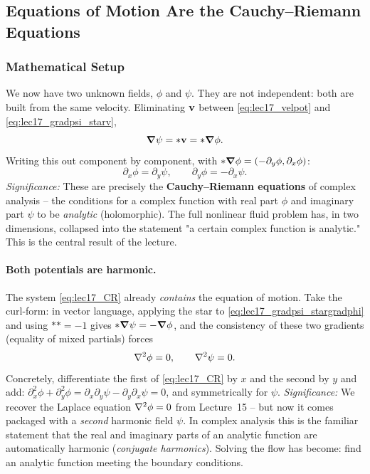 \documentclass[../main.tex]{subfiles}
\begin{document}
\subsection{Equations of Motion Are the Cauchy--Riemann Equations}\label{sec:lec17:cr}

\subsubsection*{Mathematical Setup}
We now have two unknown fields, $\phi$ and $\psi$. They are not independent: both are built from the same velocity. Eliminating $\mathbf{v}$ between \eqref{eq:lec17_velpot} and \eqref{eq:lec17_gradpsi_starv},
\begin{equation}
  \grad\psi = \ast\mathbf{v} = \ast\grad\phi.
  \label{eq:lec17_gradpsi_stargradphi}
\end{equation}
Writing this out component by component, with $\ast\grad\phi=(-\partial_y\phi,\partial_x\phi)$:
\begin{equation}
  \boxed{\partial_x\phi = \partial_y\psi,\qquad \partial_y\phi = -\partial_x\psi.}
  \label{eq:lec17_CR}
\end{equation}
\textit{Significance:} These are precisely the \textbf{Cauchy--Riemann equations} of complex analysis -- the conditions for a complex function with real part $\phi$ and imaginary part $\psi$ to be \emph{analytic} (holomorphic). The full nonlinear fluid problem has, in two dimensions, collapsed into the statement "a certain complex function is analytic." This is the central result of the lecture.

\paragraph{Both potentials are harmonic.} The system \eqref{eq:lec17_CR} already \emph{contains} the equation of motion. Take the curl-form: in vector language, applying the star to \eqref{eq:lec17_gradpsi_stargradphi} and using $\ast\ast=-1$ gives $\ast\grad\psi=-\grad\phi$, and the consistency of these two gradients (equality of mixed partials) forces
\begin{equation}
  \nabla^2\phi = 0,\qquad \nabla^2\psi = 0.
  \label{eq:lec17_harmonic}
\end{equation}
Concretely, differentiate the first of \eqref{eq:lec17_CR} by $x$ and the second by $y$ and add: $\partial_x^2\phi+\partial_y^2\phi=\partial_x\partial_y\psi-\partial_y\partial_x\psi=0$, and symmetrically for $\psi$.
\textit{Significance:} We recover the Laplace equation $\nabla^2\phi=0$ from Lecture~15 -- but now it comes packaged with a \emph{second} harmonic field $\psi$. In complex analysis this is the familiar statement that the real and imaginary parts of an analytic function are automatically harmonic (\emph{conjugate harmonics}). Solving the flow has become: find an analytic function meeting the boundary conditions.
\end{document}
